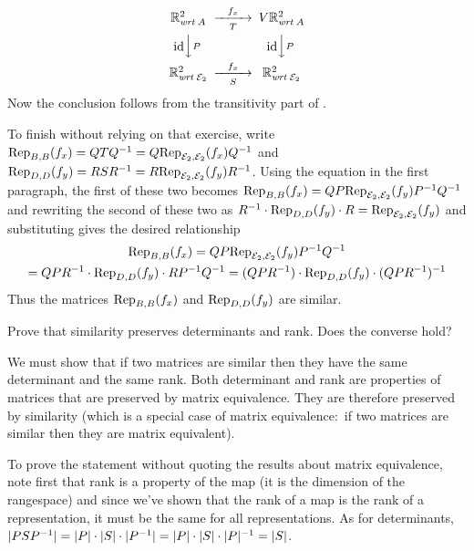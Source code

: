 \begin{exercises}
\begin{answer}
        \begin{equation*}
          \begin{CD}
            \Re^2_{\wrt{A}}                   
               @>f_x>T>        
               V\Re^2_{\wrt{A}}       \\
            @V\scriptstyle\identity VPV                
               @V\scriptstyle\identity VPV \\
            \Re^2_{\wrt{\stdbasis_2}}         
               @>f_x>S>        
               \Re^2_{\wrt{\stdbasis_2}}
          \end{CD}
        \end{equation*}
        Now the conclusion follows from the transitivity part of
        .
        
        To finish without relying on that exercise, write
        $\rep{f_x}{B,B}=QTQ^{-1}=Q\rep{f_x}{\stdbasis_2,\stdbasis_2}Q^{-1}$
        and
        $\rep{f_y}{D,D}=RSR^{-1}=R\rep{f_y}{\stdbasis_2,\stdbasis_2}R^{-1}$.
        Using the equation in the first paragraph, 
        the first of these two becomes
        $\rep{f_x}{B,B}=QP\rep{f_y}{\stdbasis_2,\stdbasis_2}P^{-1}Q^{-1}$
        and  
        rewriting the second of these two as
        $R^{-1}\cdot\rep{f_y}{D,D}\cdot R=\rep{f_y}{\stdbasis_2,\stdbasis_2}$
        and substituting gives the desired relationship
        \begin{multline*}
          \rep{f_x}{B,B}
          =QP\rep{f_y}{\stdbasis_2,\stdbasis_2}P^{-1}Q^{-1}  \\
          =QPR^{-1}\cdot\rep{f_y}{D,D}\cdot RP^{-1}Q^{-1}
          =(QPR^{-1})\cdot\rep{f_y}{D,D}\cdot (QPR^{-1})^{-1}
        \end{multline*}
        Thus the matrices \( \rep{f_x}{B,B}  \) and \( \rep{f_y}{D,D} \) are
        similar. 
      \end{answer}
  \item 
     Prove that similarity preserves determinants and rank.
     Does the converse hold?
     \begin{answer}
       We must show that if two matrices are similar then they have the same
       determinant and the same rank.
       Both determinant and rank are properties of matrices that 
       are preserved by matrix equivalence. 
       They are therefore preserved by similarity (which is a 
       special case of matrix equivalence:~if two matrices
       are similar then they are matrix equivalent).

       To prove the statement without quoting the results about
       matrix equivalence, note first that
       rank is a property of the map (it is the dimension of the rangespace)
       and since we've shown that 
       the rank of a map is the rank of a representation,
       it must be the same for all representations.
       As for determinants,
       \( \deter{PSP^{-1}}=\deter{P}\cdot\deter{S}\cdot\deter{P^{-1}}
          =\deter{P}\cdot\deter{S}\cdot\deter{P}^{-1}=\deter{S} \).


\end{answer}
\end{exercises}
